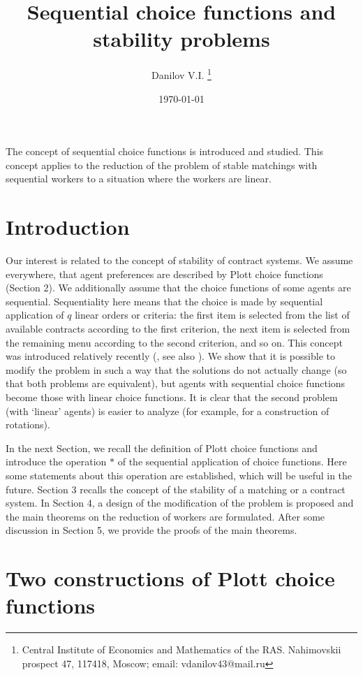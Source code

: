 \documentclass[12pt,a4paper]{article}
\begin{document}
\title{Sequential choice functions and stability problems}
\author{Danilov V.I. \thanks{Central Institute of Economics and Mathematics of the RAS. Nahimovskii prospect 47, 117418, Moscow; email: vdanilov43@mail.ru}}
\date{\today}
\maketitle


The concept of sequential choice functions is introduced and studied. This concept applies to the reduction of the problem of stable matchings with sequential workers to a situation where the workers are linear.


\section{Introduction}

Our interest is related to the concept of stability of contract systems. We assume everywhere, that agent preferences are described by Plott choice functions (Section 2). We additionally assume that the choice functions of some agents are sequential. Sequentiality here means that the choice is made by sequential application of $q$ linear orders or criteria: the first item is selected from the list of available contracts according to the first criterion, the next item is selected from the remaining menu according to the second criterion, and so on. This concept was introduced relatively recently (\cite{CY}, see also \cite{HM}). We show that it is possible to modify the problem in such a way that the solutions do not actually change (so that both problems are equivalent), but agents with sequential choice functions become those with linear choice functions. It is clear that the second problem (with `linear' agents) is easier to analyze (for example, for a construction of rotations).

In the next Section, we recall the definition of Plott choice functions and
introduce the operation $*$ of the sequential application of choice functions. Here some statements about this operation are established, which will be useful in the future. Section 3 recalls the concept of the stability of a matching or a contract system. In Section 4, a design of the modification of the problem is proposed and the main theorems on the reduction of workers are formulated. After some discussion in Section 5, we provide the proofs of the main theorems.

\section{Two constructions of Plott choice functions}
\end{document}
